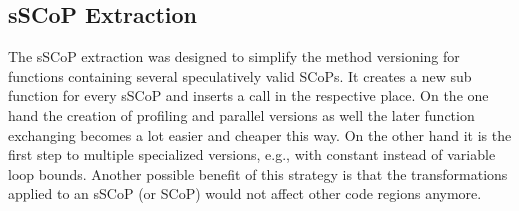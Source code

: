 \subsection{sSCoP Extraction}
\label{sSCoPExtraction}
The sSCoP extraction was designed to simplify the method versioning for functions 
containing several speculatively valid SCoPs. It creates a new sub function for 
every sSCoP and inserts a call in the respective place. On the one hand the creation 
of profiling and parallel versions as well the later function exchanging becomes
a lot easier and cheaper this way. On the other hand it is the first step to 
multiple specialized versions, e.g., with constant instead of variable loop 
bounds. Another possible benefit of this strategy is that the transformations 
applied to an sSCoP (or SCoP) would not affect other code regions anymore. 







